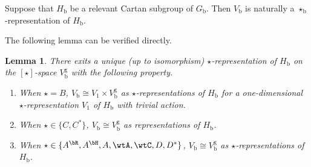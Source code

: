 \documentclass[12pt]{amsart}
\numberwithin{equation}{section}
\newtheorem{lem}[thm]{Lemma}
\theoremstyle{remark}
\begin{document}
Suppose that
 $H_\mathrm b$ be a relevant Cartan subgroup of $G_\mathrm b$. Then $V_\mathrm b$ is naturally a $\star_\mathrm b$-representation of $H_\mathrm b$.

The following lemma can be verified directly.

\begin{lem}\label{match1} \label{match2} \label{match3}
There exits a unique (up to isomorphism) $\star$-representation  of $H_\mathrm b$ on the $[\star]$-space $V_\mathrm b^\mathrm g$
with the following property.
\begin{enumerate}[label=(\alph*),wide=0pt]
    \item When $\star=B$, $V_\mathrm b\cong V_1\times V_\mathrm b^\mathrm g$
    as $\star$-representations of $H_\mathrm b$
    for a one-dimensional $\star$-representation $V_1$ of $H_\mathrm b$ with trivial action.
    \item When $\star\in \{C, C^*\}$,
    $V_\mathrm b\cong V_\mathrm b^\mathrm g$
    as representations of $H_\mathrm b$.
    \item When $\star\in \{A^\bR, A^\bH, A, \wtA, \wtC,  D, D^* \}$,
    $V_\mathrm b\cong V_\mathrm b^\mathrm g$
    as $\star$-representations of $H_\mathrm b$.
\end{enumerate}
\end{lem}

%
%
%
%
%
\end{document}
